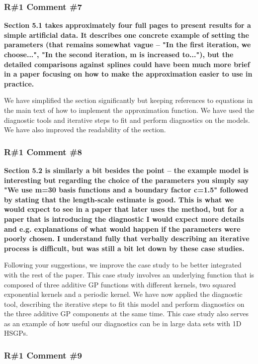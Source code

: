 \documentclass[11pt]{report}
\begin{document}
\subsubsection*{R\#1 Comment \#7}

\textbf{Section 5.1 takes approximately four full pages to present results for a simple artificial data. It describes one concrete example of setting the parameters (that remains somewhat vague -- "In the first iteration, we choose...", "In the second iteration, m is increased to..."), but the detailed comparisons against splines could have been much more brief in a paper focusing on how to make the approximation easier to use in practice.}

We have simplified the section significantly but keeping references to equations in the main text of how to implement the approximation function. We have used the diagnostic tools and iterative steps to fit and perform diagnostics on the models. We have also improved the readability of the section.

\subsubsection*{R\#1 Comment \#8}

\textbf{Section 5.2 is similarly a bit besides the point -- the example model is interesting but regarding the choice of the parameters you simply say "We use m=30 basis functions and a boundary factor c=1.5" followed by stating that the length-scale estimate is good. This is what we would expect to see in a paper that later uses the method, but for a paper that is introducing the diagnostic I would expect more details and e.g. explanations of what would happen if the parameters were poorly chosen. I understand fully that verbally describing an iterative process is difficult, but was still a bit let down by these case studies.}

Following your suggestions, we improve the case study to be better integrated with the rest of the paper. This case study involves an underlying function that is composed of three additive GP functions with different kernels, two squared exponential kernels and a periodic kernel. We have now applied the diagnostic tool, describing the iterative steps to fit this model and perform diagnostics on the three additive GP components at the same time. This case study also serves as an example of how useful our diagnostics can be in large data sets with 1D HSGPs.

\subsubsection*{R\#1 Comment \#9}
\end{document}
